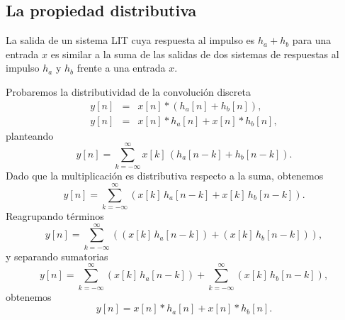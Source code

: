 \subsection{La propiedad distributiva}

La salida de un sistema LIT cuya respuesta al impulso es $h_{a} + h_{b}$ para una entrada $x$ es 
similar a la suma de las salidas de dos sistemas de respuestas al impulso $h_{a}$ y $h_{b}$ frente a una 
entrada $x$.

Probaremos la distributividad de la convoluci\'{o}n discreta
\begin{eqnarray}
       y\left[ n\right] &=&x\left[ n\right]  * \left( h_{a}\left[ n\right] + h_{b}\left[ n\right] \right) , \\
       y\left[ n\right] &=&x\left[ n\right]  * h_{a}\left[ n\right] + x\left[ n\right]  * h_{b}\left[ n\right],
\end{eqnarray}
planteando
\begin{equation}
 y\left[ n\right] =
\sum_{k=-\infty }^{\infty }x\left[ k\right] \, \left( h_{a}\left[ n-k\right] +h_{b}\left[ n-k\right] \right).
\end{equation}
Dado que la multiplicaci\'{o}n es distributiva respecto a la suma, obtenemos
\begin{equation}
        y\left[ n\right] =
        \sum_{k=-\infty }^{\infty }
        \left( x\left[ k\right] \, h_{a}\left[ n-k\right] +x\left[ k\right] \,h_{b}\left[ n-k\right] \right).
\end{equation}
Reagrupando t\'{e}rminos
\begin{equation}
        y\left[ n\right] =
                \sum_{k=-\infty }^{\infty }
                        \left(  \left( 
                                        x\left[ k\right] \, h_a\left[ n-k\right] 
                                \right) +
                                \left( 
                                        x\left[ k\right] \, h_{b}\left[ n-k\right] 
                                \right) 
                        \right) ,
\end{equation}
y separando sumatorias
\begin{equation}
        y\left[ n\right] =
                \sum_{k=-\infty }^{\infty }\left( x\left[ k\right] \, h_{a}\left[ n-k\right] \right) +
                \sum_{k=-\infty }^{\infty }\left( x\left[ k\right] \, h_{b}\left[ n-k\right] \right) ,
\end{equation}
obtenemos
\begin{equation}
y\left[ n\right] =x\left[ n\right]  * h_a\left[ n\right] +x\left[ n \right] * h_{b}\left[ n\right] .
\end{equation}

